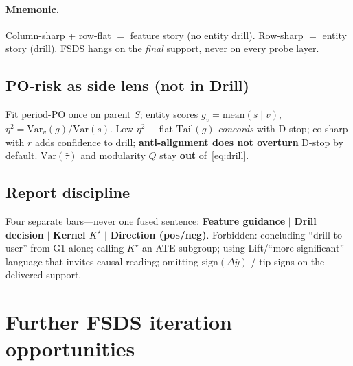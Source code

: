 \documentclass[11pt]{article}
\begin{document}
\paragraph{Mnemonic.}
Column-sharp + row-flat $=$ feature story (no entity drill).
Row-sharp $=$ entity story (drill).
FSDS hangs on the \emph{final} support, never on every probe layer.

\subsection{PO-risk as side lens (not in Drill)}
Fit period-PO once on parent \(S\); entity scores
\(g_v=\mathrm{mean}(s\mid v)\),
\(\eta^2=\mathrm{Var}_v(g)/\mathrm{Var}(s)\).
Low \(\eta^2\) + flat \(\mathrm{Tail}(g)\) \emph{concords} with
D-stop; co-sharp with \(r\) adds confidence to drill;
\textbf{anti-alignment does not overturn} D-stop by default.
\(\mathrm{Var}(\hat\tau)\) and modularity \(Q\) stay
\textbf{out} of~\eqref{eq:drill}.

\subsection{Report discipline}
Four separate bars---never one fused sentence:
\textbf{Feature guidance} $|$ \textbf{Drill decision} $|$
\textbf{Kernel \(K^\star\)} $|$ \textbf{Direction (pos/neg)}.
Forbidden: concluding ``drill to user'' from G1 alone;
calling \(K^\star\) an ATE subgroup; using Lift/``more
significant'' language that invites causal reading;
omitting $\mathrm{sign}(\Delta\bar y)$ / tip signs on the
delivered support.

\section{Further FSDS iteration opportunities}
\label{sec:next}
\end{document}
